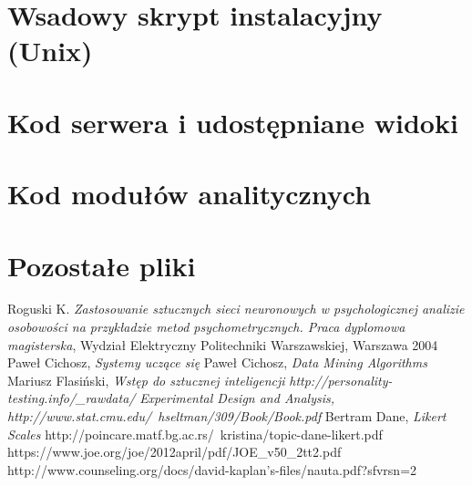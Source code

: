 \documentclass[12pt,a4paper,oneside]{report} %
\begin{document}
\section{Wsadowy skrypt instalacyjny (Unix)}
%
%
\section{Kod serwera i udostępniane widoki}
%
%
%
%
%
%
%
%
\section{Kod modułów analitycznych}
\section{Pozostałe pliki}

\begin{thebibliography}{9}
 Roguski K. \emph{Zastosowanie sztucznych sieci neuronowych w psychologicznej analizie osobowości na przykładzie metod psychometrycznych. Praca dyplomowa magisterska}, Wydział Elektryczny Politechniki Warszawskiej, Warszawa 2004
 Paweł Cichosz, \emph{Systemy uczące się}
 Paweł Cichosz, \emph{Data Mining Algorithms}
 Mariusz Flasiński, \emph{Wstęp do sztucznej inteligencji}
 \emph{http://personality-testing.info/_rawdata/}
 \emph{Experimental Design and Analysis, http://www.stat.cmu.edu/~hseltman/309/Book/Book.pdf}
 Bertram Dane, \emph{Likert Scales} http://poincare.matf.bg.ac.rs/~kristina/topic-dane-likert.pdf
   https://www.joe.org/joe/2012april/pdf/JOE_v50_2tt2.pdf
 http://www.counseling.org/docs/david-kaplan's-files/nauta.pdf?sfvrsn=2
\end{thebibliography}
\end{document}

